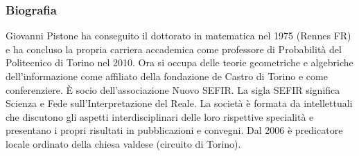 \documentclass[xcolor=svgnames]{beamer}
\begin{document}
\begin{frame}[plain]\small\frametitle{Biografia}
  Giovanni Pistone ha conseguito il dottorato in matematica nel 1975 (Rennes FR) e ha concluso la propria carriera accademica come professore di Probabilità del Politecnico di Torino nel 2010. Ora si occupa delle teorie geometriche e algebriche dell’informazione come affiliato della fondazione de Castro di Torino e come conferenziere. \`E socio dell’associazione Nuovo SEFIR. La sigla SEFIR significa Scienza e Fede sull’Interpretazione del Reale. La società è formata da intellettuali che discutono gli aspetti interdisciplinari delle loro rispettive specialità e presentano i propri risultati in pubblicazioni e convegni. Dal 2006 è predicatore locale ordinato della chiesa valdese (circuito di Torino).  
\end{frame}
\end{document}
